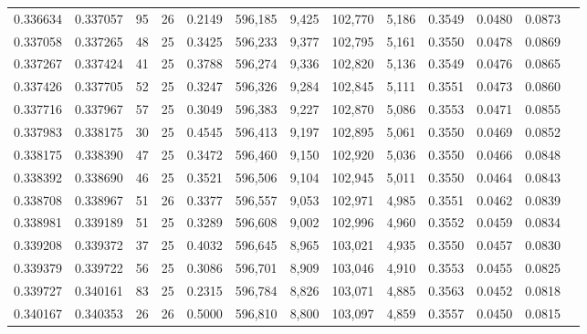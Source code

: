 \begin{tabular}{rrrrrrrrrrrrr}
0.336634 & 0.337057 &  95 &  26 &                                     0.2149 & 596,185 &   9,425 & 102,770 &   5,186 & 0.3549 & 0.0480 & 0.0873 \\
0.337058 & 0.337265 &  48 &  25 &                                     0.3425 & 596,233 &   9,377 & 102,795 &   5,161 & 0.3550 & 0.0478 & 0.0869 \\
0.337267 & 0.337424 &  41 &  25 &                                     0.3788 & 596,274 &   9,336 & 102,820 &   5,136 & 0.3549 & 0.0476 & 0.0865 \\
0.337426 & 0.337705 &  52 &  25 &                                     0.3247 & 596,326 &   9,284 & 102,845 &   5,111 & 0.3551 & 0.0473 & 0.0860 \\
0.337716 & 0.337967 &  57 &  25 &                                     0.3049 & 596,383 &   9,227 & 102,870 &   5,086 & 0.3553 & 0.0471 & 0.0855 \\
0.337983 & 0.338175 &  30 &  25 &                                     0.4545 & 596,413 &   9,197 & 102,895 &   5,061 & 0.3550 & 0.0469 & 0.0852 \\
0.338175 & 0.338390 &  47 &  25 &                                     0.3472 & 596,460 &   9,150 & 102,920 &   5,036 & 0.3550 & 0.0466 & 0.0848 \\
0.338392 & 0.338690 &  46 &  25 &                                     0.3521 & 596,506 &   9,104 & 102,945 &   5,011 & 0.3550 & 0.0464 & 0.0843 \\
0.338708 & 0.338967 &  51 &  26 &                                     0.3377 & 596,557 &   9,053 & 102,971 &   4,985 & 0.3551 & 0.0462 & 0.0839 \\
0.338981 & 0.339189 &  51 &  25 &                                     0.3289 & 596,608 &   9,002 & 102,996 &   4,960 & 0.3552 & 0.0459 & 0.0834 \\
0.339208 & 0.339372 &  37 &  25 &                                     0.4032 & 596,645 &   8,965 & 103,021 &   4,935 & 0.3550 & 0.0457 & 0.0830 \\
0.339379 & 0.339722 &  56 &  25 &                                     0.3086 & 596,701 &   8,909 & 103,046 &   4,910 & 0.3553 & 0.0455 & 0.0825 \\
0.339727 & 0.340161 &  83 &  25 &                                     0.2315 & 596,784 &   8,826 & 103,071 &   4,885 & 0.3563 & 0.0452 & 0.0818 \\
0.340167 & 0.340353 &  26 &  26 &                                     0.5000 & 596,810 &   8,800 & 103,097 &   4,859 & 0.3557 & 0.0450 & 0.0815 \\

\end{tabular}
